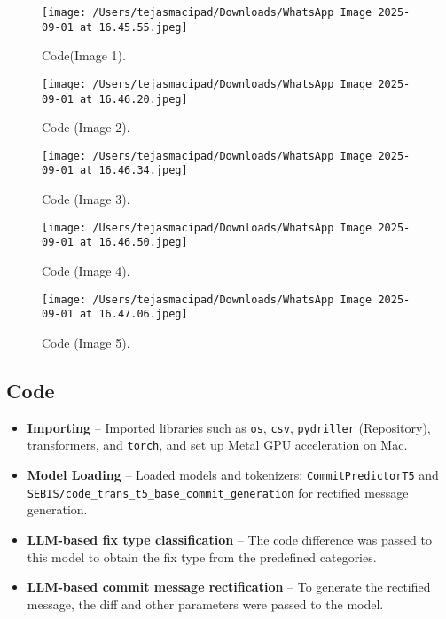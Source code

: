 \documentclass[12pt, a4paper]{report}
\begin{document}

\begin{figure}[h!]
    \centering
    \texttt{[image: /Users/tejasmacipad/Downloads/WhatsApp Image 2025-09-01 at 16.45.55.jpeg]}
    \caption{Code(Image 1).}
\end{figure}

\begin{figure}[h!]
    \centering
    \texttt{[image: /Users/tejasmacipad/Downloads/WhatsApp Image 2025-09-01 at 16.46.20.jpeg]}
    \caption{Code (Image 2).}
\end{figure}

\begin{figure}[h!]
    \centering
    \texttt{[image: /Users/tejasmacipad/Downloads/WhatsApp Image 2025-09-01 at 16.46.34.jpeg]}
    \caption{Code (Image 3).}
\end{figure}

\begin{figure}[h!]
    \centering
    \texttt{[image: /Users/tejasmacipad/Downloads/WhatsApp Image 2025-09-01 at 16.46.50.jpeg]}
    \caption{Code (Image 4).}
\end{figure}

\begin{figure}[h!]
    \centering
    \texttt{[image: /Users/tejasmacipad/Downloads/WhatsApp Image 2025-09-01 at 16.47.06.jpeg]}
    \caption{Code (Image 5).}
\end{figure}


\subsection*{Code}

\begin{itemize}
    \item \textbf{Importing} -- Imported libraries such as \texttt{os}, \texttt{csv}, \texttt{pydriller} (Repository), transformers, and \texttt{torch}, and set up Metal GPU acceleration on Mac.
    \item \textbf{Model Loading} -- Loaded models and tokenizers: \texttt{CommitPredictorT5} and \texttt{SEBIS/code\_trans\_t5\_base\_commit\_generation} for rectified message generation.
    \item \textbf{LLM-based fix type classification} -- The code difference was passed to this model to obtain the fix type from the predefined categories.
    \item \textbf{LLM-based commit message rectification} -- To generate the rectified message, the diff and other parameters were passed to the model.
\end{itemize}
\end{document}
